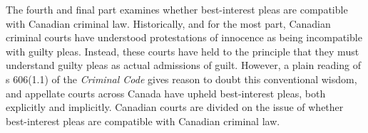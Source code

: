 The fourth and final part examines whether best-interest pleas are compatible with Canadian criminal law. Historically, and for the most part, Canadian criminal courts have understood protestations of innocence as being incompatible with guilty pleas. Instead, these courts have held to the principle that they must understand guilty pleas as actual admissions of guilt. However, a plain reading of s 606(1.1) of the \textit{Criminal Code} gives reason to doubt this conventional wisdom, and appellate courts across Canada have upheld best-interest pleas, both explicitly and implicitly. Canadian courts are divided on the issue of whether best-interest pleas are compatible with Canadian criminal law.
